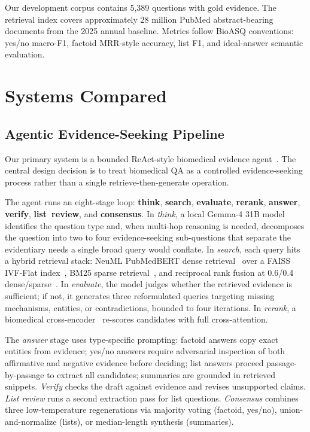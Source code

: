 \documentclass[sigconf,anonymous,review]{acmart}
\begin{document}
Our development corpus contains 5,389 questions with gold evidence.
The retrieval index covers approximately 28 million PubMed abstract-bearing documents from the 2025 annual baseline.
Metrics follow BioASQ conventions: yes/no macro-F1, factoid MRR-style accuracy, list F1, and ideal-answer semantic evaluation.

\section{Systems Compared}

\subsection{Agentic Evidence-Seeking Pipeline}

Our primary system is a bounded ReAct-style biomedical evidence agent~\cite{dao2026agentic}.
The central design decision is to treat biomedical QA as a controlled evidence-seeking process rather than a single retrieve-then-generate operation.

The agent runs an eight-stage loop: \textbf{think}, \textbf{search}, \textbf{evaluate}, \textbf{rerank}, \textbf{answer}, \textbf{verify}, \textbf{list~review}, and \textbf{consensus}.
In \emph{think}, a local Gemma-4 31B model identifies the question type and, when multi-hop reasoning is needed, decomposes the question into two to four evidence-seeking sub-questions that separate the evidentiary needs a single broad query would conflate.
In \emph{search}, each query hits a hybrid retrieval stack: NeuML PubMedBERT dense retrieval~\cite{gu2021domain,neuml2026embeddings} over a FAISS IVF-Flat index~\cite{douze2024faiss}, BM25 sparse retrieval~\cite{robertson2009bm25}, and reciprocal rank fusion at 0.6/0.4 dense/sparse~\cite{cormack2009rrf}.
In \emph{evaluate}, the model judges whether the retrieved evidence is sufficient; if not, it generates three reformulated queries targeting missing mechanisms, entities, or contradictions, bounded to four iterations.
In \emph{rerank}, a biomedical cross-encoder~\cite{neuml2026reranker} re-scores candidates with full cross-attention.

The \emph{answer} stage uses type-specific prompting: factoid answers copy exact entities from evidence; yes/no answers require adversarial inspection of both affirmative and negative evidence before deciding; list answers proceed passage-by-passage to extract all candidates; summaries are grounded in retrieved snippets.
\emph{Verify} checks the draft against evidence and revises unsupported claims.
\emph{List review} runs a second extraction pass for list questions.
\emph{Consensus} combines three low-temperature regenerations via majority voting (factoid, yes/no), union-and-normalize (lists), or median-length synthesis (summaries).
\end{document}
